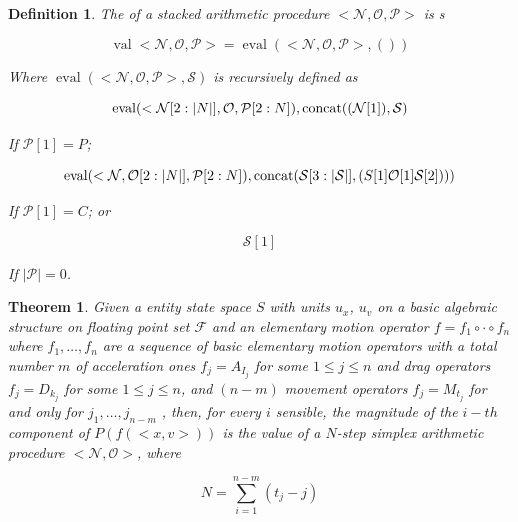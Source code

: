 \documentclass{book}
\newtheorem{definition}{Definition}
\newtheorem{theorem}{Theorem}
\theoremstyle{definition}\newtheorem{mechanism}{Mechanism}
\theoremstyle{remark}\newtheorem*{remark}{Remark}
\begin{document}
\begin{definition}
	The  of a stacked arithmetic procedure $<\mathcal N, \mathcal O, \mathcal P>$ is s
	
	\begin{equation*}
		\operatorname{val} <\mathcal N, \mathcal O, \mathcal P> = \operatorname{eval}(<\mathcal N, \mathcal O, \mathcal P>, ())
	\end{equation*}
	
	Where $\operatorname{eval}(<\mathcal N, \mathcal O, \mathcal P>, \mathcal S)$ is recursively defined as
	
	\begin{equation*}
		\operatorname{eval}(<\mathcal N[2:|N|], \mathcal O, \mathcal P[2:N]), \operatorname{concat}((\mathcal N[1]), \mathcal S)\\
	\end{equation*}
	
	If $\mathcal P[1] = P$;
	
	\begin{equation*}
		\operatorname{eval}(<\mathcal N, \mathcal O[2:|N|], \mathcal P[2:N]), \operatorname{concat}(\mathcal S[3:|\mathcal S|], (\mathcal \mathcal S[1]\mathcal O[1]\mathcal S[2])))
	\end{equation*}
	
	If $\mathcal P[1] = C$; or
	
	\begin{equation*}
		\mathcal S[1]
	\end{equation*}
	
	If $|\mathcal P| = 0$.
\end{definition}

\begin{theorem}
	Given a entity state space $S$ with units $u_x$, $u_v$ on a basic algebraic structure on floating point set $\mathcal F$ and an elementary motion operator $f = f_1 \circ \cdot \circ f_n$ where $f_1, \dots, f_n$ are a sequence of basic elementary motion operators with a total number $m$ of acceleration ones $f_j = A_{I_j}$ for some $1\le j\le n$ and drag operators $f_j = D_{k_j}$ for some $1\le j\le n$, and $(n - m)$ movement operators $f_j = M_{t_j}$ for and only for $j_1, \dots, j_{n - m}$ , then, for every $i$ sensible, the magnitude of the $i-th$ component of $P(f(<x, v>))$ is the value of a $N$-step simplex arithmetic procedure $<\mathcal N, \mathcal O>$, where
	
	\begin{equation*}
		N = \sum_{i = 1}^{n - m}(t_j - j)
	\end{equation*}
\end{theorem}
\end{document}
